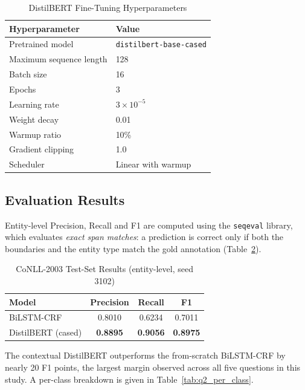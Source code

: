 \begin{table}[h]
\centering
\caption{DistilBERT Fine-Tuning Hyperparameters}
\label{tab:bert_ner_hp}
\begin{tabular}{ll}
\toprule
Hyperparameter & Value \\
\midrule
Pretrained model        & \texttt{distilbert-base-cased} \\
Maximum sequence length & 128 \\
Batch size              & 16 \\
Epochs                  & 3 \\
Learning rate           & $3 \times 10^{-5}$ \\
Weight decay            & 0.01 \\
Warmup ratio            & 10\% \\
Gradient clipping       & 1.0 \\
Scheduler               & Linear with warmup \\
\bottomrule
\end{tabular}
\end{table}

\subsection{Evaluation Results}

Entity-level Precision, Recall and F1 are computed using the
\texttt{seqeval} library, which evaluates \emph{exact span matches}: a
prediction is correct only if both the boundaries and the entity type
match the gold annotation (Table~\ref{tab:q2_results}).

\begin{table}[h]
\centering
\caption{CoNLL-2003 Test-Set Results (entity-level, seed 3102)}
\label{tab:q2_results}
\begin{tabular}{lccc}
\toprule
Model & Precision & Recall & F1 \\
\midrule
BiLSTM-CRF         & 0.8010 & 0.6234 & 0.7011 \\
DistilBERT (cased) & \textbf{0.8895} & \textbf{0.9056} & \textbf{0.8975} \\
\bottomrule
\end{tabular}
\end{table}

The contextual DistilBERT outperforms the from-scratch BiLSTM-CRF by
nearly 20 F1 points, the largest margin observed across all five
questions in this study. A per-class breakdown is given in
Table~\ref{tab:q2_per_class}.

